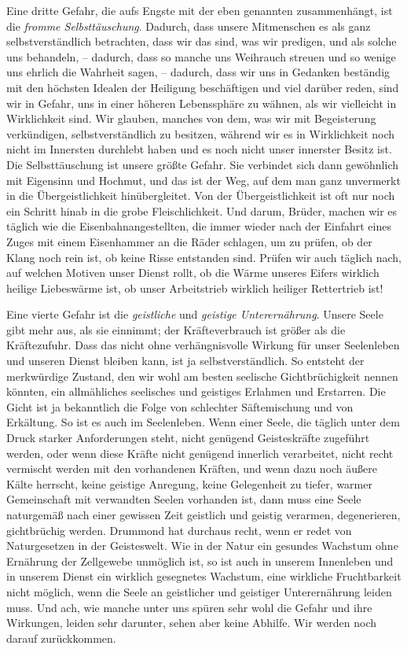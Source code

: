 \documentclass[a5paper,openany]{book}
\begin{document}
\par
Eine dritte Gefahr, die aufs Engste mit der eben genannten zusammenhängt, ist die \emph{fromme Selbsttäuschung}. Dadurch, dass unsere Mitmenschen es als ganz selbstverständlich betrachten, dass wir das sind, was wir predigen, und als solche uns behandeln, – dadurch, dass so manche uns Weihrauch streuen und so wenige uns ehrlich die Wahrheit sagen, – dadurch, dass wir uns in Gedanken beständig mit den höchsten Idealen der Heiligung beschäftigen und viel darüber reden, sind wir in Gefahr, uns in einer höheren Lebenssphäre zu wähnen, als wir vielleicht in Wirklichkeit sind. Wir glauben, manches von dem, was wir mit Begeisterung verkündigen, selbstverständlich zu besitzen, während wir es in Wirklichkeit noch nicht im Innersten durchlebt haben und es noch nicht unser innerster Besitz ist. Die Selbsttäuschung ist unsere größte Gefahr. Sie verbindet sich dann gewöhnlich mit Eigensinn und Hochmut, und das ist der Weg, auf dem man ganz unvermerkt in die Übergeistlichkeit hinübergleitet. Von der Übergeistlichkeit ist oft nur noch ein Schritt hinab in die grobe Fleischlichkeit. Und darum, Brüder, machen wir es täglich wie die Eisenbahnangestellten, die immer wieder nach der Einfahrt eines Zuges mit einem Eisenhammer an die Räder schlagen, um zu prüfen, ob der Klang noch rein ist, ob keine Risse entstanden sind. Prüfen wir auch täglich nach, auf welchen Motiven unser Dienst rollt, ob die Wärme unseres Eifers wirklich heilige Liebeswärme ist, ob unser Arbeitstrieb wirklich heiliger Rettertrieb ist!
\par
Eine vierte Gefahr ist die \emph{geistliche} und \emph{geistige Unterernährung}. Unsere Seele gibt mehr aus, als sie einnimmt; der Kräfteverbrauch ist größer als die Kräftezufuhr. Dass das nicht ohne verhängnisvolle Wirkung für unser Seelenleben und unseren Dienst bleiben kann, ist ja selbstverständlich. So entsteht der merkwürdige Zustand, den wir wohl am besten seelische Gichtbrüchigkeit nennen könnten, ein allmähliches seelisches und geistiges Erlahmen und Erstarren. Die Gicht ist ja bekanntlich die Folge von schlechter Säftemischung und von Erkältung. So ist es auch im Seelenleben. Wenn einer Seele, die täglich unter dem Druck starker Anforderungen steht, nicht genügend Geisteskräfte zugeführt werden, oder wenn diese Kräfte nicht genügend innerlich verarbeitet, nicht recht vermischt werden mit den vorhandenen Kräften, und wenn dazu noch äußere Kälte herrscht, keine geistige Anregung, keine Gelegenheit zu tiefer, warmer Gemeinschaft mit verwandten Seelen vorhanden ist, dann muss eine Seele naturgemäß nach einer gewissen Zeit geistlich und geistig verarmen, degenerieren, gichtbrüchig werden. Drummond hat durchaus recht, wenn er redet von Naturgesetzen in der Geisteswelt. Wie in der Natur ein gesundes Wachstum ohne Ernährung der Zellgewebe unmöglich ist, so ist auch in unserem Innenleben und in unserem Dienst ein wirklich gesegnetes Wachstum, eine wirkliche Fruchtbarkeit nicht möglich, wenn die Seele an geistlicher und geistiger Unterernährung leiden muss. Und ach, wie manche unter uns spüren sehr wohl die Gefahr und ihre Wirkungen, leiden sehr darunter, sehen aber keine Abhilfe. Wir werden noch darauf zurückkommen.
\end{document}
